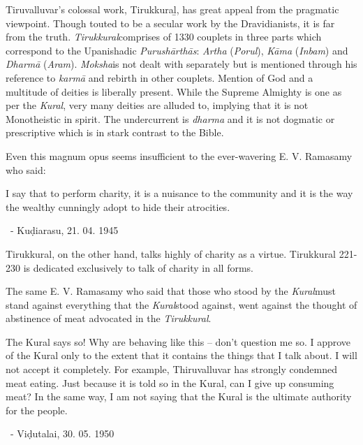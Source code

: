 Tiruvalluvar’s colossal work, Tirukkuraḻ, has great appeal from the pragmatic viewpoint. Though touted to be a secular work by the Dravidianists, it is far from the truth. \textit{Tirukkural}comprises of 1330 couplets in three parts which correspond to the Upanishadic \textit{Purushārthās}: \textit{Artha} (\textit{Porul}), \textit{Kāma} (\textit{Inbam}) and \textit{Dharmā} (\textit{Aram}). \textit{Moksha}is not dealt with separately but is mentioned through his reference to \textit{karmā} and rebirth in other couplets. Mention of God and a multitude of deities is liberally present. While the Supreme Almighty is one as per the \textit{Kural}, very many deities are alluded to, implying that it is not Monotheistic in spirit. The undercurrent is \textit{dharma} and it is not dogmatic or prescriptive which is in stark contrast to the Bible.

Even this magnum opus seems insufficient to the ever-wavering E. V. Ramasamy who said:

\begin{myquote}
I say that to perform charity, it is a nuisance to the community and it is the way the wealthy cunningly adopt to hide their atrocities.

~\hfill - Kuḍiarasu, 21. 04. 1945
\end{myquote}

Tirukkural, on the other hand, talks highly of charity as a virtue. Tirukkural 221-230 is dedicated exclusively to talk of charity in all forms.

The same E. V. Ramasamy who said that those who stood by the \textit{Kural}must stand against everything that the \textit{Kural}stood against, went against the thought of abstinence of meat advocated in the \textit{Tirukkural}.

\begin{myquote}
The Kural says so! Why are behaving like this – don’t question me so. I approve of the Kural only to the extent that it contains the things that I talk about. I will not accept it completely. For example, Thiruvalluvar has strongly condemned meat eating. Just because it is told so in the Kural, can I give up consuming meat? In the same way, I am not saying that the Kural is the ultimate authority for the people.

~\hfill - Viḍutalai, 30. 05. 1950
\end{myquote}

